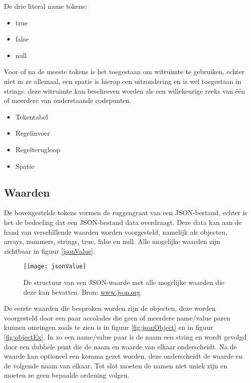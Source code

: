 De drie literal name tokens:

\begin{itemize}
    \item true  
    \item false     
    \item null      
\end{itemize}

Voor of na de meeste tokens is het toegestaan om witruimte te gebruiken, echter niet in ze allemaal, een spatie is hierop een uitzondering en is wel toegestaan in strings. deze witruimte kan beschreven worden als een willekeurige reeks van één of meerdere van onderstaande codepunten.

\begin{itemize}
    \item Tekentabel       
    \item Regelinvoer       
    \item Regelterugloop   
    \item Spatie           
\end{itemize}


\subsection{Waarden}
\label{subsec:Waarden}

De bovengestelde tokens vormen de ruggengraat van een JSON-bestand, echter is het de bedoeling dat een JSON-bestand data overdraagt. Deze data kan aan de hand van verschillende waarden worden voorgesteld, namelijk als objecten, arrays, nummers, strings, true, false en null. Alle mogelijke waarden zijn zichtbaar in figuur \ref{jsonValue}.

\begin{figure}[ht]
    \centering
    \texttt{[image: jsonValue]}
   \caption[JSON values]{De structuur van een JSON-waarde met alle mogelijke waarden die deze kan bevatten. Bron: \url{www.json.org}}
   \label{fig:jsonValue}
\end{figure}

De eerste waarden die besproken worden zijn de objecten, deze worden voorgesteld door een paar accolades die geen of meerdere name/value paren kunnen omringen zoals te zien is in figuur \ref{fig:jsonObject} en in figuur \ref{fig:objectEx}. In zo een name/value paar is de naam een string en wordt gevolgd door een dubbele punt die de naam en waarde van elkaar onderscheidt. 
Na de waarde kan optioneel een komma gezet worden, deze onderscheidt de waarde en de volgende naam van elkaar. Tot slot moeten de namen niet uniek zijn en moeten ze geen bepaalde ordening volgen.

